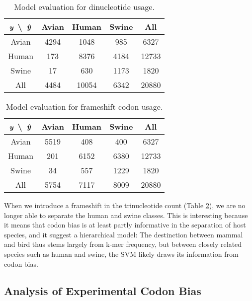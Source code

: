 \begin{table}[htbp]
    \centering
    \begin{tabular}{c | c | c | c | c}
        $\hm{y}$ \textbackslash~$\hm{\hat{y}}$ & Avian & Human & Swine & All \\
        \hline
        Avian   & 4294  & 1048    & 985    & 6327 \\
        Human   & 173   & 8376    & 4184   & 12733 \\
        Swine   & 17    & 630     & 1173   & 1820  \\
        All     & 4484  & 10054   & 6342   & 20880 \\
    \end{tabular}
    \caption{Model evaluation for dinucleotide usage.}
    \label{tab:confusion-2nt}
\end{table}


\begin{table}[htbp]
    \centering
    \begin{tabular}{c | c | c | c | c}
        $\hm{y}$ \textbackslash~$\hm{\hat{y}}$ & Avian & Human & Swine & All \\
        \hline
        Avian   & 5519  & 408    & 400    & 6327 \\
        Human   & 201   & 6152    & 6380   & 12733 \\
        Swine   & 34    & 557     & 1229   & 1820  \\
        All     & 5754  & 7117   & 8009   & 20880 \\
    \end{tabular}
    \caption{Model evaluation for frameshift codon usage.}
    \label{tab:confusion-frameshift}
\end{table}


When we introduce a frameshift in the trinucleotide count (Table \ref{tab:confusion-frameshift}), we are no longer able to separate the human and swine classes. This is interesting because it means that codon bias is at least partly informative in the separation of host species, and it suggest a hierarchical model: The destinction between mammal and bird thus stems largely from k-mer frequency, but between closely related species such as human and swine, the SVM likely draws its information from codon bias.


\newpage\subsection{Analysis of Experimental Codon Bias}

